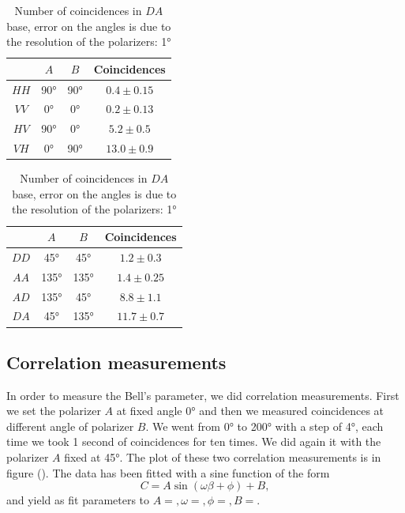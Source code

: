 \documentclass[a4paper,10pt]{article}
\begin{document}
\begin{table}[h]
\centering
\begin{minipage}{.48\textwidth}
\centering
\begin{tabular}{c|c|c|c}
  & $A$& $B$& Coincidences \\
\hline
$HH$ & 90° & 90° & $0.4 \pm 0.15$\\
$VV$ & 0° & 0° & $0.2 \pm 0.13$\\
$HV$ & 90° & 0° & $5.2 \pm 0.5$ \\
$VH$ & 0° & 90° & $13.0\pm 0.9$\\
\end{tabular}
\caption{\label{tab:visibilityHV}Number of coincidences in $HV$ base, error on the angles is due to the resolution of the polarizers: 1°}
\end{minipage}\hspace{1.5em}%
\begin{minipage}{.48\textwidth}
\centering
\begin{tabular}{c|c|c|c}
  & $A$& $B$& Coincidences \\
\hline
$DD$ & 45° & 45° & $1.2 \pm 0.3$\\
$AA$ & 135° & 135° & $1.4 \pm 0.25$\\
$AD$ & 135° & 45° & $8.8 \pm 1.1$ \\
$DA$ & 45° & 135° & $11.7 \pm 0.7$\\
\end{tabular}
\caption{\label{tab:visibilityDA}Number of coincidences in $DA$ base, error on the angles is due to the resolution of the polarizers: 1°}
\end{minipage}
\end{table}
\subsection{Correlation measurements}
In order to measure the Bell's parameter, we did correlation measurements. First we set the polarizer $A$ at fixed angle 0° and then we measured coincidences at different angle of polarizer $B$. We went from 0° to 200° with a step of 4°, each time we took 1 second of coincidences for ten times. We did again it with the polarizer $A$ fixed at 45°. The plot of these two correlation measurements is in figure (). The data has been fitted with a sine function of the form
\[C = A\sin(\omega\beta +\phi) +  B,\] 
and yield as fit parameters to $A = ,\omega=,\phi=,B=$.
\end{document}

